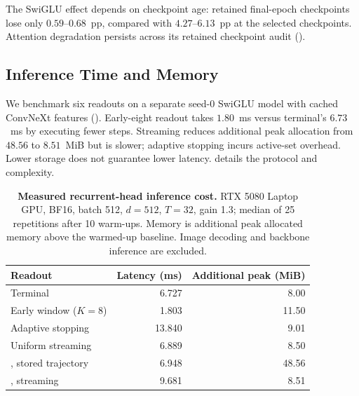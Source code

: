 The SwiGLU effect depends on checkpoint age: retained final-epoch checkpoints
lose only $0.59$--$0.68$~pp, compared with $4.27$--$6.13$~pp at the selected
checkpoints. Attention degradation persists across its retained checkpoint
audit ().

\subsection{Inference Time and Memory}
\label{sec:cost}

We benchmark six readouts on a separate seed-0 SwiGLU model with cached
ConvNeXt features (). Early-eight readout takes $1.80$~ms
versus terminal's $6.73$~ms by executing fewer steps. Streaming \grace{}
reduces additional peak allocation from $48.56$ to $8.51$~MiB but is slower;
adaptive stopping incurs active-set overhead. Lower storage does not guarantee
lower latency.  details the protocol and complexity.

\begin{table}[H]
\centering
\caption{\textbf{Measured recurrent-head inference cost.} RTX 5080 Laptop GPU,
BF16, batch 512, $d=512$, $T=32$, gain 1.3; median of 25 repetitions after
10 warm-ups. Memory is additional peak allocated memory above the warmed-up
baseline. Image decoding and backbone inference are excluded.}
\label{tab:cost_main}
\small
\begin{tabular}{lrr}
\toprule
Readout & Latency (ms) & Additional peak (MiB) \\
\midrule
Terminal & 6.727 & 8.00 \\
Early window ($K=8$) & 1.803 & 11.50 \\
Adaptive stopping & 13.840 & 9.01 \\
Uniform streaming & 6.889 & 8.50 \\
\grace{}, stored trajectory & 6.948 & 48.56 \\
\grace{}, streaming & 9.681 & 8.51 \\
\bottomrule
\end{tabular}
\end{table}
